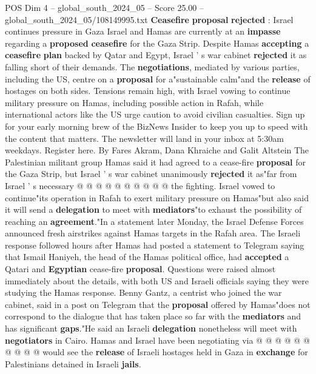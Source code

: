 \begin{textsample}{POS Dim 4 – global\_south\_2024\_05 – Score 25.00 – global\_south\_2024\_05/108149995.txt}  \label{ex:f4_pos_205}
\textbf{Ceasefire} \textbf{proposal} \textbf{rejected} : Israel continues pressure in Gaza Israel and Hamas are currently at an \textbf{impasse} regarding a \textbf{proposed} \textbf{ceasefire} for the Gaza Strip.
Despite Hamas \textbf{accepting} a \textbf{ceasefire} \textbf{plan} backed by Qatar and Egypt, Israel ' s war cabinet \textbf{rejected} it as falling short of their demands.
The \textbf{negotiations}, mediated by various parties, including the US, centre on a \textbf{proposal} for a"sustainable calm"and the \textbf{release} of hostages on both sides.
Tensions remain high, with Israel vowing to continue military pressure on Hamas, including possible action in Rafah, while international actors like the US urge caution to avoid civilian casualties.
Sign up for your early morning brew of the BizNews Insider to keep you up to speed with the content that matters.
The newsletter will land in your inbox at 5:30am weekdays.
Register here.
By Fares Akram, Dana Khraiche and Galit Altstein The Palestinian militant group Hamas said it had agreed to a cease-fire \textbf{proposal} for the Gaza Strip, but Israel ' s war cabinet unanimously \textbf{rejected} it as"far from Israel ' s necessary @ @ @ @ @ @ @ @ @ @ the fighting.
Israel vowed to continue"its operation in Rafah to exert military pressure on Hamas"but also said it will send a \textbf{delegation} to meet with \textbf{mediators}"to exhaust the possibility of reaching an \textbf{agreement}."In a statement later Monday, the Israel Defense Forces announced fresh airstrikes against Hamas targets in the Rafah area.
The Israeli response followed hours after Hamas had posted a statement to Telegram saying that Ismail Haniyeh, the head of the Hamas political office, had \textbf{accepted} a Qatari and \textbf{Egyptian} cease-fire \textbf{proposal}.
Questions were raised almost immediately about the details, with both US and Israeli officials saying they were studying the Hamas response.
Benny Gantz, a centrist who joined the war cabinet, said in a post on Telegram that the \textbf{proposal} offered by Hamas"does not correspond to the dialogue that has taken place so far with the \textbf{mediators} and has significant \textbf{gaps}."He said an Israeli \textbf{delegation} nonetheless will meet with \textbf{negotiators} in Cairo.
Hamas and Israel have been negotiating via @ @ @ @ @ @ @ @ @ @ would see the \textbf{release} of Israeli hostages held in Gaza in \textbf{exchange} for Palestinians detained in Israeli \textbf{jails}.

\end{textsample}

